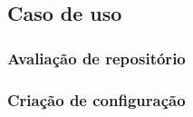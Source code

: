 \documentclass[12pt]{article}
\begin{document}
  \subsection{Caso de uso}
    \subsubsection{Avaliação de repositório}
    \subsubsection{Criação de configuração}

\newpage


\end{document}
